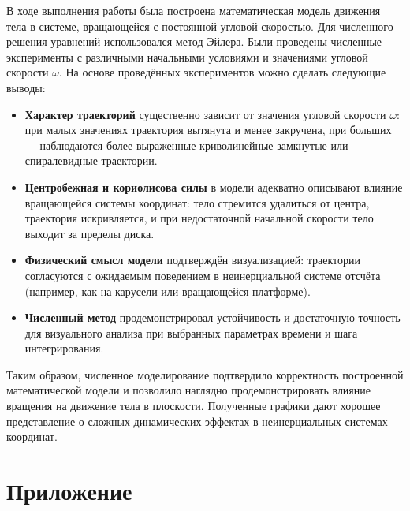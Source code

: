 \documentclass[a4paper,12pt]{article}
\begin{document}
В ходе выполнения работы была построена математическая модель движения тела в системе, вращающейся с постоянной угловой скоростью. Для численного решения уравнений использовался метод Эйлера. Были проведены численные эксперименты с различными начальными условиями и значениями угловой скорости $\omega$.
На основе проведённых экспериментов можно сделать следующие выводы:

\begin{itemize}
\item \textbf{Характер траекторий} существенно зависит от значения угловой скорости $\omega$: при малых значениях траектория вытянута и менее закручена, при больших — наблюдаются более выраженные криволинейные замкнутые или спиралевидные траектории.
\item \textbf{Центробежная и кориолисова силы} в модели адекватно описывают влияние вращающейся системы координат: тело стремится удалиться от центра, траектория искривляется, и при недостаточной начальной скорости тело выходит за пределы диска.
\item \textbf{Физический смысл модели} подтверждён визуализацией: траектории согласуются с ожидаемым поведением в неинерциальной системе отсчёта (например, как на карусели или вращающейся платформе).
\item \textbf{Численный метод} продемонстрировал устойчивость и достаточную точность для визуального анализа при выбранных параметрах времени и шага интегрирования.
\end{itemize}

Таким образом, численное моделирование подтвердило корректность построенной математической модели и позволило наглядно продемонстрировать влияние вращения на движение тела в плоскости. Полученные графики дают хорошее представление о сложных динамических эффектах в неинерциальных системах координат.


\newpage

\section{Приложение}
\end{document}
